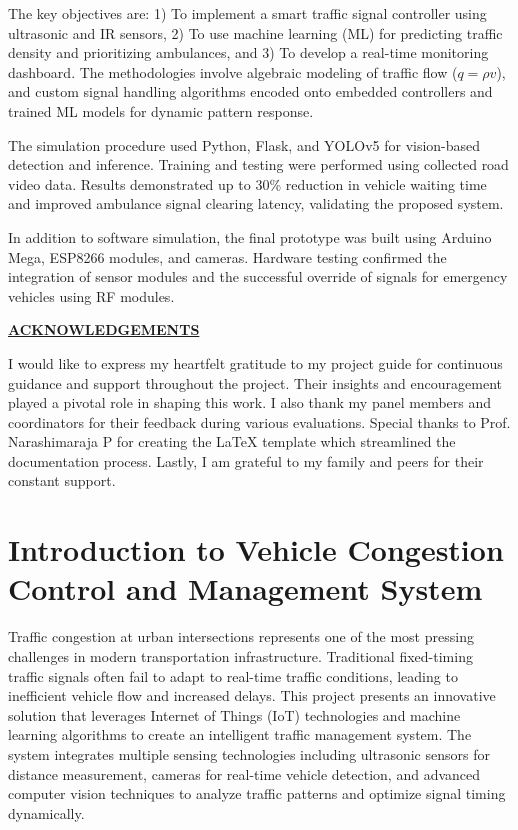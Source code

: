 \documentclass[12pt]{report}
\begin{document}
The key objectives are: 1) To implement a smart traffic signal controller using ultrasonic and IR sensors, 2) To use machine learning (ML) for predicting traffic density and prioritizing ambulances, and 3) To develop a real-time monitoring dashboard. The methodologies involve algebraic modeling of traffic flow ($q = \rho v$), and custom signal handling algorithms encoded onto embedded controllers and trained ML models for dynamic pattern response.

The simulation procedure used Python, Flask, and YOLOv5 for vision-based detection and inference. Training and testing were performed using collected road video data. Results demonstrated up to 30\% reduction in vehicle waiting time and improved ambulance signal clearing latency, validating the proposed system.

In addition to software simulation, the final prototype was built using Arduino Mega, ESP8266 modules, and cameras. Hardware testing confirmed the integration of sensor modules and the successful override of signals for emergency vehicles using RF modules.

\pagebreak

\thispagestyle{empty}

\begin{center}
\Large\textbf{\underline{ACKNOWLEDGEMENTS}} \par
\end{center}
I would like to express my heartfelt gratitude to my project guide for continuous guidance and support throughout the project. Their insights and encouragement played a pivotal role in shaping this work. I also thank my panel members and coordinators for their feedback during various evaluations. Special thanks to Prof. Narashimaraja P for creating the LaTeX template which streamlined the documentation process. Lastly, I am grateful to my family and peers for their constant support.

\pagebreak


\chapter{Introduction to Vehicle Congestion Control and Management System}
Traffic congestion at urban intersections represents one of the most pressing challenges in modern transportation infrastructure. Traditional fixed-timing traffic signals often fail to adapt to real-time traffic conditions, leading to inefficient vehicle flow and increased delays. This project presents an innovative solution that leverages Internet of Things (IoT) technologies and machine learning algorithms to create an intelligent traffic management system. The system integrates multiple sensing technologies including ultrasonic sensors for distance measurement, cameras for real-time vehicle detection, and advanced computer vision techniques to analyze traffic patterns and optimize signal timing dynamically.
\end{document}
